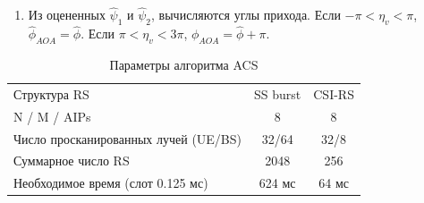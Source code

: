 \begin{enumerate}[label=\textbf{Шаг \arabic*:}]
\begin{equation}
\begin{pmatrix}
{                  1 & \exp{i\eta_4} & \exp{i2\eta_4} & \dots & \exp{i7\eta_4} \\
                  }
              \end{pmatrix}^T
          \end{equation}
    Обновляется $\eta_{v_2}$ и повторяется шаг 5 до тех пор, пока не будет 
    достигнута необходимая точность. Получаем $\hat \psi_2 = (\eta_{v_2} + \pi)\mod(2\pi) - \pi$, где $(x \mod  y)$ -- остаток от деления $x$ на $y$.
    \item Из оцененных $\hat \psi_1$ и $\hat \psi_2$, вычисляются углы прихода. Если $-\pi < \eta_v < \pi$, 
    $\hat \phi_{AOA} = \hat \phi$. Если $\pi < \eta_v < 3\pi$, $\phi_{AOA} = \hat \phi + \pi$.
\end{enumerate}
\begin{table}[h!]
    \centering
    \caption{Параметры алгоритма ACS}
    \begin{tabular}{lcc}
        \toprule
        \midrule
        Структура RS                         & SS burst & CSI-RS \\
        N / M / AIPs                         & 8        & 8      \\
        Число просканированных лучей (UE/BS) & 32/64    & 32/8   \\
        Суммарное число RS                   & 2048     & 256    \\
        Необходимое время (слот 0.125 мс)    & 624 мс   & 64 мс  \\
        \hline
    \end{tabular}
\end{table}
